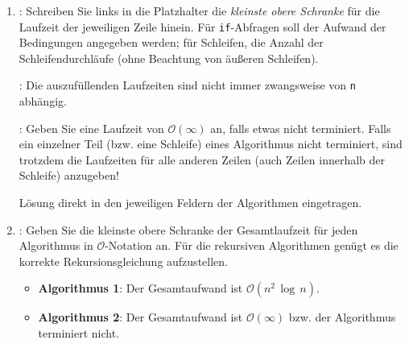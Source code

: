 \documentclass[german, solution]{acAssignment}
\begin{document}
\begin{enumerate}
    \item
        :
        Schreiben Sie links in die Platzhalter die \emph{kleinste obere Schranke} für die Laufzeit der jeweiligen Zeile hinein.
        Für \texttt{if}-Abfragen soll der Aufwand der Bedingungen angegeben werden; für Schleifen, die Anzahl der Schleifendurchläufe (ohne Beachtung von äußeren Schleifen).
    
        \acNote:
        Die auszufüllenden Laufzeiten sind nicht immer zwangsweise von \texttt{n} abhängig.
        
        \acNote:
        Geben Sie eine Laufzeit von $\mathcal{O}(\infty)$ an, falls etwas nicht terminiert.
        Falls ein einzelner Teil (bzw. eine Schleife) eines Algorithmus nicht terminiert, sind trotzdem die Laufzeiten für alle anderen Zeilen (auch Zeilen innerhalb der Schleife) anzugeben!
        
        \begin{acSolution}
            Lösung direkt in den jeweiligen Feldern der Algorithmen eingetragen.
        \end{acSolution}
    
    \item\label{subtask:receq}
        :
        Geben Sie die kleinste obere Schranke der Gesamtlaufzeit für jeden Algorithmus in $\mathcal{O}$-Notation an.
        Für die rekursiven Algorithmen genügt es die korrekte Rekursionsgleichung aufzustellen.
        
        \begin{acSolution}
            \begin{itemize}
                \item\textbf{Algorithmus 1}:
                    Der Gesamtaufwand ist $\mathcal{O}(n^2\,\log\,n)$.
                    
                \item\textbf{Algorithmus 2}:
                    Der Gesamtaufwand ist $\mathcal{O}(\infty)$ bzw. der Algorithmus terminiert nicht.
                    

\end{itemize}
\end{acSolution}
\end{enumerate}
\end{document}
